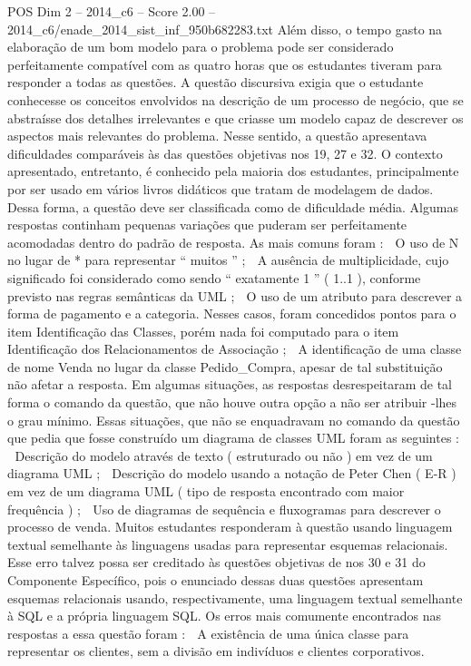 \begin{textsample}{POS Dim 2 – 2014\_c6 – Score 2.00 – 2014\_c6/enade\_2014\_sist\_inf\_950b682283.txt}
Além disso, o tempo gasto na elaboração de um bom modelo para o problema pode ser considerado perfeitamente compatível com as quatro horas que os estudantes tiveram para responder a todas as questões.
A questão discursiva exigia que o estudante conhecesse os conceitos envolvidos na descrição de um processo de negócio, que se abstraísse dos detalhes irrelevantes e que criasse um modelo capaz de descrever os aspectos mais relevantes do problema.
Nesse sentido, a questão apresentava dificuldades comparáveis às das questões objetivas nos 19, 27 e 32.
O contexto apresentado, entretanto, é conhecido pela maioria dos estudantes, principalmente por ser usado em vários livros didáticos que tratam de modelagem de dados.
Dessa forma, a questão deve ser classificada como de dificuldade média.
Algumas respostas continham pequenas variações que puderam ser perfeitamente acomodadas dentro do padrão de resposta.
As mais comuns foram :  O uso de N no lugar de * para representar “ muitos ” ;  A ausência de multiplicidade, cujo significado foi considerado como sendo “ exatamente 1 ” ( 1..1 ), conforme previsto nas regras semânticas da UML ;  O uso de um atributo para descrever a forma de pagamento e a categoria.
Nesses casos, foram concedidos pontos para o item Identificação das Classes, porém nada foi computado para o item Identificação dos Relacionamentos de Associação ;  A identificação de uma classe de nome Venda no lugar da classe Pedido\_Compra, apesar de tal substituição não afetar a resposta.
Em algumas situações, as respostas desrespeitaram de tal forma o comando da questão, que não houve outra opção a não ser atribuir -lhes o grau mínimo.
Essas situações, que não se enquadravam no comando da questão que pedia que fosse construído um diagrama de classes UML foram as seguintes :  Descrição do modelo através de texto ( estruturado ou não ) em vez de um diagrama UML ;  Descrição do modelo usando a notação de Peter Chen ( E-R ) em vez de um diagrama UML ( tipo de resposta encontrado com maior frequência ) ;  Uso de diagramas de sequência e fluxogramas para descrever o processo de venda.
Muitos estudantes responderam à questão usando linguagem textual semelhante às linguagens usadas para representar esquemas relacionais.
Esse erro talvez possa ser creditado às questões objetivas de nos 30 e 31 do Componente Específico, pois o enunciado dessas duas questões apresentam esquemas relacionais usando, respectivamente, uma linguagem textual semelhante à SQL e a própria linguagem SQL.
Os erros mais comumente encontrados nas respostas a essa questão foram :  A existência de uma única classe para representar os clientes, sem a divisão em indivíduos e clientes corporativos.

\end{textsample}

